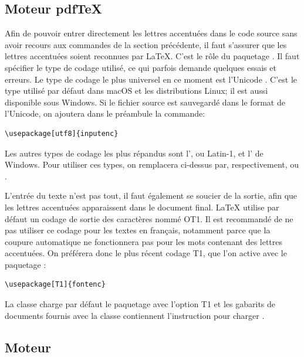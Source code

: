 {\subsection{Moteur pdf\TeX}
\label{sec:bases:francais:pdftex}

Afin de pouvoir entrer directement les lettres accentuées dans le code
source sans avoir recours aux commandes de la section précédente, il
faut s'assurer que les lettres accentuées soient reconnues par
{\LaTeX}. C'est le rôle du paquetage  \citep{inputenc}.
Il faut spécifier le type de codage utilisé, ce qui parfois demande
quelques essais et erreurs. Le type de codage le plus universel en ce
moment est l'Unicode \citep{Unicode:5.0}. C'est le type utilisé par
défaut dans macOS et les distributions Linux; il est aussi
disponible sous Windows. Si le fichier source est sauvegardé dans le
format %
de l'Unicode, on ajoutera dans le préambule la commande:
\begin{lstlisting}
\usepackage[utf8]{inputenc}
\end{lstlisting}

Les autres types de codage les plus répandus sont
l', ou
Latin-1, et l'
de Windows. Pour utiliser ces types, on remplacera 
ci-dessus par, respectivement,  ou .

L'entrée du texte n'est pas tout, il faut également se soucier de la
sortie, afin que les lettres accentuées apparaissent dans le document
final. {\LaTeX} utilise par défaut un codage de sortie des caractères
nommé OT1. Il est recommandé de ne pas utiliser ce codage pour les
textes en français, notamment parce que la coupure automatique ne
fonctionnera pas pour les mots contenant des lettres accentuées. On
préférera donc le plus récent codage T1, que l'on active avec le
paquetage  \citep{fontenc}:
\begin{lstlisting}
\usepackage[T1]{fontenc}
\end{lstlisting}

La classe  charge par défaut le paquetage 
avec l'option T1 et les gabarits de documents fournis avec la classe
contiennent l'instruction pour charger .

\subsection{Moteur \XeTeX}
\label{sec:bases:francais:xetex}

}

